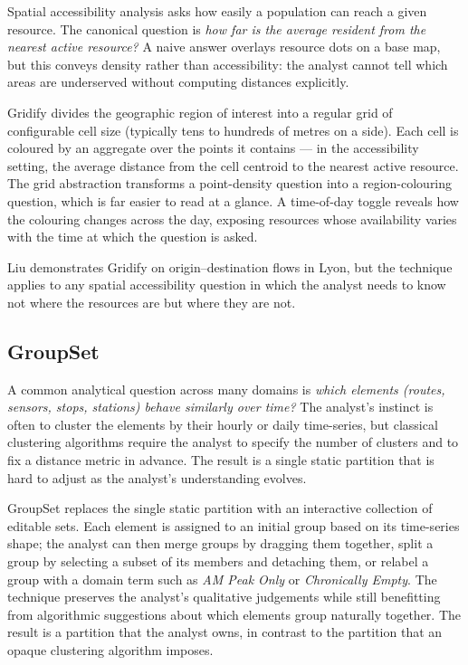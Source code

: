 Spatial accessibility analysis asks how easily a population
can reach a given resource. The canonical question is
\emph{how far is the average resident from the nearest active
resource?} A naive answer overlays resource dots on a base map,
but this conveys density rather than accessibility: the analyst
cannot tell which areas are underserved without computing
distances explicitly.

Gridify divides the geographic region of interest into a
regular grid of configurable cell size (typically tens to
hundreds of metres on a side). Each cell is coloured by an
aggregate over the points it contains --- in the accessibility
setting, the average distance from the cell centroid to the
nearest active resource. The grid abstraction transforms a
point-density question into a region-colouring question, which
is far easier to read at a glance. A time-of-day toggle
reveals how the colouring changes across the day, exposing
resources whose availability varies with the time at which the
question is asked.

Liu demonstrates Gridify on origin--destination flows in Lyon,
but the technique applies to any spatial accessibility question
in which the analyst needs to know not where the resources are
but where they are not.

\subsection{GroupSet}
\label{sec:theory:groupset}

A common analytical question across many domains is \emph{which
elements (routes, sensors, stops, stations) behave similarly
over time?} The analyst's instinct is often to cluster the
elements by their hourly or daily time-series, but classical
clustering algorithms require the analyst to specify the number
of clusters and to fix a distance metric in advance. The result
is a single static partition that is hard to adjust as the
analyst's understanding evolves.

GroupSet replaces the single static partition with an
interactive collection of editable sets. Each element is
assigned to an initial group based on its time-series shape;
the analyst can then merge groups by dragging them together,
split a group by selecting a subset of its members and
detaching them, or relabel a group with a domain term such as
\emph{AM Peak Only} or \emph{Chronically Empty}. The technique
preserves the analyst's qualitative judgements while still
benefitting from algorithmic suggestions about which elements
group naturally together. The result is a partition that the
analyst owns, in contrast to the partition that an opaque
clustering algorithm imposes.

